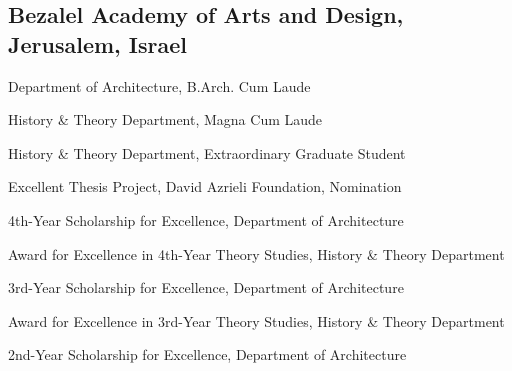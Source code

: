 \subsection*{Bezalel Academy of Arts and Design, Jerusalem, Israel}
\begin{tablist}
    \item[2008] \tab Department of Architecture, B.Arch. Cum Laude
    \item[2008] \tab History \& Theory Department, Magna Cum Laude
    \item[2008] \tab History \& Theory Department, Extraordinary Graduate Student
    \item[2008] \tab Excellent Thesis Project, David Azrieli Foundation, Nomination
    \item[2007] \tab 4th-Year Scholarship for Excellence, Department of Architecture
    \item[2007] \tab Award for Excellence in 4th-Year Theory Studies, History \& Theory Department
    \item[2006] \tab 3rd-Year Scholarship for Excellence, Department of Architecture
    \item[2006] \tab Award for Excellence in 3rd-Year Theory Studies, History \& Theory Department
    \item[2005] \tab 2nd-Year Scholarship for Excellence, Department of Architecture
\end{tablist}
